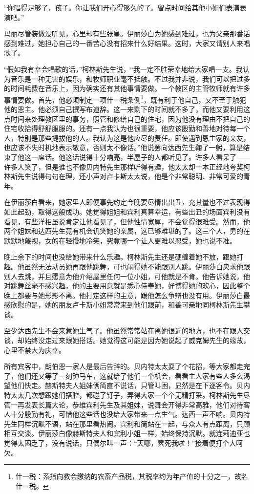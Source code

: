 \par “你唱得足够了，孩子。你让我们开心得够久的了。留点时间给其他小姐们表演表演吧。”
\par 玛丽尽管装做没听见，心里却有些张皇。伊丽莎白为她感到难过，也为父亲那番话感到难过，她担心自己的一番苦心没有招来什么好结果。这时，大家又请别人来唱歌了。
\par “假如我有幸会唱歌的话，”柯林斯先生说，“我一定不胜荣幸地给大家唱一支。我认为音乐是一种无害的娱乐，和牧师职业毫不抵触。不过我并非说，我们可以把过多的时间耗费在音乐上，因为确实还有其他事情要做。一个教区的主管牧师就有许多事情要做。首先，他必须制定一项什一税条例\footnote{什一税：系指向教会缴纳的农畜产品税，其税率约为年产值的十分之一，故名什一税。}，既有利于他自己，又不至于触犯他的恩主。他必须自己撰写布道辞。这一来剩下的时间就不多了，而他又要利用这点时间来处理教区里的事务，照管和修缮自己的住宅，因为他没有理由不把自己的住宅收拾得舒舒服服的。还有一点我认为也很重要，他应该殷勤和善地对待每一个人，特别是那些提拔他的人。我认为这是他应尽的责任。即使遇到恩主家的亲友，也应该不失时机地表示敬意，否则太不像话。”他说罢向达西先生鞠了一躬，算是结束了他这一席话。他这话说得十分响亮，半屋子的人都听见了。许多人看呆了——许多人笑了，但是谁也不像贝内特先生那样听得有趣，他太太却一本正经地夸奖柯林斯先生说得句句在理，还小声对卢卡斯太太说，他是个非常聪明、非常可爱的青年。
\par 在伊丽莎白看来，她家里人即便事先约定今晚要尽情出出丑，充其量也不过表现得如此起劲，取得这般成功。她觉得姐姐和宾利真算幸运，有些出丑的场面宾利没有看见，有些洋相虽说肯定让他看见了，但他性情宽厚，不会觉得很难受。然而，他两个姐妹和达西先生竟有机会讥笑她的亲属，这已够难堪的了。这三个人，男的在默默地蔑视，女的在轻慢地冷笑，究竟哪一个让人更难以忍受，她也说不准。
\par 晚上余下的时间也没给她带来什么乐趣。柯林斯先生还是硬缠着她不放，跟她打趣。他虽然无法动员她再跟他跳舞，可也闹得她不能跟别人跳。伊丽莎白央求他跟别人去跳，并且愿意为他介绍屋里任何一位小姐，可他就是不肯。他告诉她说，他对跳舞丝毫不感兴趣，他的主要用意就是悉心侍奉她，好博得她的欢心，因此整个晚上都要与她形影不离。他打定这样的主意，跟他怎么争辩也没有用。伊丽莎白最感欣慰的是，她的朋友卢卡斯小姐常常来到他们跟前，和善可亲地同柯林斯先生攀谈。
\par 至少达西先生不会来惹她生气了。他虽然常常站在离她很近的地方，也不在跟人交谈，却始终没走过来跟她搭话。她觉得这可能是因为她说起了威克姆先生的缘故，心里不禁大为庆幸。
\par 所有宾客中，朗伯恩一家人是最后告辞的。贝内特太太耍了个花招，等大家都走完了，他们还又等了一刻钟马车，这就给了他们一个机会，看看主人家有些人多么渴望他们快走。赫斯特夫人姐妹俩简直不说话，只管叫困，显然是在下逐客令。贝内特太太几次想跟她们搭腔，都碰了钉子，弄得大家一个个无精打采。柯林斯先生尽管一再发表长篇大论，恭维宾利先生及其姐妹，说舞会开得非常高雅，他们对待客人十分殷勤有礼，可惜他这些话也没给大家带来一点生气。达西一声不响。贝内特先生同样沉默不语，站在那里看热闹。宾利和简站在一起，与众人有点距离，只顾相互交谈。伊丽莎白像赫斯特夫人和宾利小姐一样，始终保持沉默。就连莉迪亚也觉得太困乏了，没有说话，只偶尔叫一声：“天哪，累死我啦！”接着便打个大呵欠。
